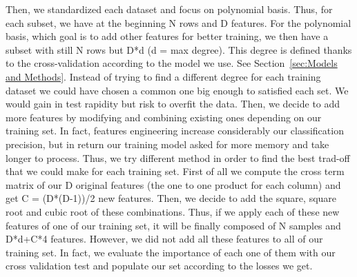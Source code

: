 \documentclass[10pt,conference,compsocconf]{IEEEtran}
\begin{document}

Then, we standardized each dataset and focus on polynomial basis. Thus, for each subset, we have at the beginning N rows and D features. For the polynomial basis, which goal is to add other features for better training, we then have a subset with still N rows but D*d (d = max degree). This degree is defined thanks to the cross-validation according to the model we use. See Section~\ref{sec:Models and Methods}. Instead of trying to find a different degree for each training dataset we could have chosen a common one big enough to satisfied each set. We would gain in test rapidity but risk to overfit the data. Then, we decide to add more features by modifying and combining existing ones depending on our training set. In fact, features engineering increase considerably our classification precision, but in return our training model asked for more memory and take longer to process. Thus, we try different method in order to find the best trad-off that we could make for each training set. First of all we compute the cross term matrix of our D original features (the one to one product for each column) and get C = (D*(D-1))/2 new features. Then, we decide to add the square, square root and cubic root of these combinations. Thus, if we apply each of these new features of one of our training set, it will be finally composed of N samples and D*d+C*4 features. However, we did not add all these features to all of our training set. In fact, we evaluate the importance of each one of them with our cross validation test and populate our set according to the losses we get. 

\end{document}

